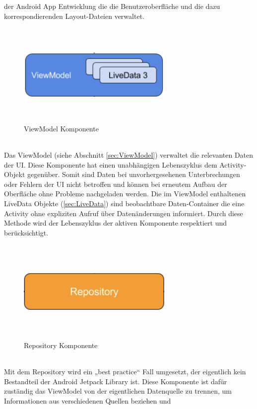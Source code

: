 der Android App Entwicklung die die Benutzeroberfläche und die dazu korrespondierenden Layout-Dateien verwaltet. 
\begin{figure}[hbt!]
    \centering
    \includegraphics[width=7.5cm,height=5cm,keepaspectratio]{2GrundlagenX/Bilder/viewModelComp.png}
    \caption{ViewModel Komponente \cite{aac.2020j}}
    \label{pic:vmComp}
\end{figure} 
\\ 
Das ViewModel (siehe Abschnitt \ref{sec:ViewModel}) verwaltet die relevanten Daten der UI. Diese Komponente hat einen unabhängigen Lebenszyklus 
dem Activity-Objekt gegenüber. Somit sind Daten bei unvorhergesehenen Unterbrechungen oder Fehlern der UI nicht betroffen und können bei 
erneutem Aufbau der Oberfläche ohne Probleme nachgeladen werden. Die im ViewModel enthaltenen LiveData Objekte (\ref{sec:LiveData}) sind 
beobachtbare Daten-Container die eine Activity ohne expliziten Aufruf über Datenänderungen informiert. Durch diese Methode wird der 
Lebenszyklus der aktiven Komponente respektiert und berücksichtigt. 
\begin{figure}[hbt!]
    \centering
    \includegraphics[width=7.5cm,height=5cm,keepaspectratio]{2GrundlagenX/Bilder/repoComp.png}
    \caption{Repository Komponente \cite{aac.2020j}}
    \label{pic:repoComp}
\end{figure} 
\\ 
Mit dem Repository wird ein „best practice“ Fall umgesetzt, der eigentlich kein Bestandteil der Android Jetpack Library ist. Diese Komponente 
ist dafür zuständig das ViewModel von der eigentlichen Datenquelle zu trennen, um Informationen aus verschiedenen Quellen beziehen und 
